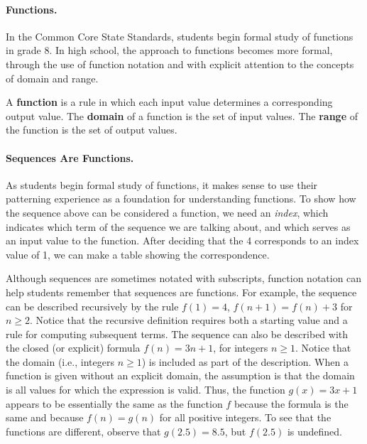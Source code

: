 \paragraph{Functions.}  In the Common Core State Standards, students begin formal study of functions in grade 8.  
In high school, the approach to functions becomes more formal, through the use of function notation and with explicit attention to the concepts of domain and range.   

\begin{definition}
A \textbf{function} is a rule in which each input value determines a corresponding output value.  The \textbf{domain} of a function is the set of input values.  The \textbf{range} of the function is the set of output values.
\end{definition}

\paragraph{Sequences Are Functions.} As students begin formal study of functions, it makes sense to use their patterning experience as a foundation for understanding functions.  To show how the sequence above can be considered a function, we need an \textit{index}, which indicates which term of the sequence we are talking about, and which serves as an input value to the function.  After deciding that the 4 corresponds to an index value of 1, we can make a table showing 
the correspondence.

Although sequences are sometimes notated with subscripts, function notation can help students remember that sequences are functions.  For example, the sequence can be described recursively by the rule $f(1) = 4$, $f(n+1) = f(n) + 3$ for $n \geq 2$.  Notice that the recursive definition requires both a starting value and a rule for computing subsequent terms.   
The sequence can also be described with the closed (or explicit) formula  $f(n) = 3n + 1$, for integers $n \geq 1$.  Notice that the domain (i.e., integers $n\geq 1$) is included as part of the description.  When a function is given without an explicit domain, the assumption is that the domain is all values for which the expression is valid.  Thus, the function $g(x) = 3x + 1$ appears to be essentially the same as the function $f$ because the formula is the same and because $f(n) = g(n)$ for all positive integers.  To see that the functions are different, observe that $g(2.5) = 8.5$, but $f(2.5)$ is undefined.  

